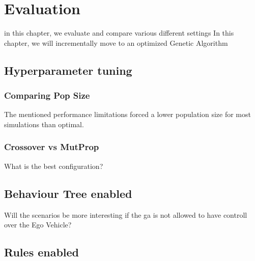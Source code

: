 \chapter{Evaluation}
in this chapter, we evaluate and compare various different settings
In this chapter, we will incrementally move to an optimized Genetic Algorithm


\section{Hyperparameter tuning}
\subsection{Comparing Pop Size}
The mentioned performance limitations forced a lower population size for most simulations than optimal.

\subsection{Crossover vs MutProp}
What is the best configuration?

\section{Behaviour Tree enabled}
Will the scenarios be more interesting if the ga is not allowed to have controll over the Ego Vehicle?

\section{Rules enabled}
